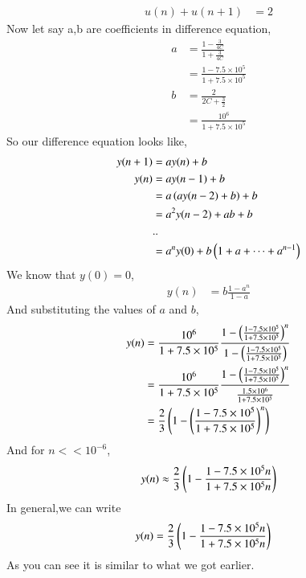 \documentclass[journal,12pt,twocolumn]{IEEEtran}
\renewcommand\thesection{\arabic{section}}
\begin{document}
\begin{enumerate}[label=\arabic*.,ref=\thesection.\theenumi]
\begin{align}
			u(n) + u(n+1) & =2
		\end{align}
                Now let say a,b are coefficients in difference equation,
		 \begin{align}
			 a &= \frac{1 - \frac{3}{4C}}{1 + \frac{3}{4C}} \\
			   &= \frac{1 - 7.5\times 10^5}{1 + 7.5\times 10^5}\\
			 b &= \frac{2}{2C + \frac{3}{2}} \\
			   &= \frac{10^6}{1 + 7.5\times 10^5}
		 \end{align}
		So our difference equation looks like,
		 \begin{align}
			 y(n+1) &= ay(n) + b \\
			 y(n)   &= ay(n-1) + b\\
			        &= a\left(ay(n-2) + b\right) + b \\
				&= a^2y(n-2) +ab + b \\
				& .. \nonumber \\
				& = a^ny(0) + b\left(1 + a + \cdots +a^{n-1}\right)
		 \end{align}
		We know that $y(0) = 0$,
		 \begin{align}
			y(n) &= b\frac{1 - a^n}{1 - a}
		 \end{align}
		 And substituting the values of $a$ and $b$,
		  \begin{align}
			  y(n) &= \frac{10^6}{1 + 7.5\times 10^5} \frac{1 - \left(\frac{1 - 7.5 \times10^5}{1 + 7.5 \times 10^5}\right)^n}{1 - \left(\frac{1 - 7.5\times 10^5}{1 + 7.5 \times 10^5}\right)} \\
			       &= \frac{10^6}{1 + 7.5\times 10^5} \frac{1 - \left(\frac{1 - 7.5 \times10^5}{1 + 7.5 \times 10^5}\right)^n}{\frac{1.5 \times10^6}{1 + 7.5\times 10^5}}\\
			       &= \frac{2}{3}\left(1 - \left(\frac{1 - 7.5 \times10^5}{1 + 7.5 \times 10^5}\right)^n\right)
		  \end{align}
		  And for $n << 10^{-6}$,
		    \begin{align}
			    y(n) \approx \frac{2}{3}\left(1 - \frac{1 - 7.5 \times 10^5n}{1 + 7.5 \times10^5n}\right)
		    \end{align}
		    In general,we can write
		     \begin{align}
			     y(n) &= \frac{2}{3}\left(1 - \frac{1 - 7.5\times 10^5n}{1 + 7.5 \times 10^5n}\right)
		     \end{align}
		As you can see it is similar to what we got earlier.
	\end{enumerate}
\end{document}
